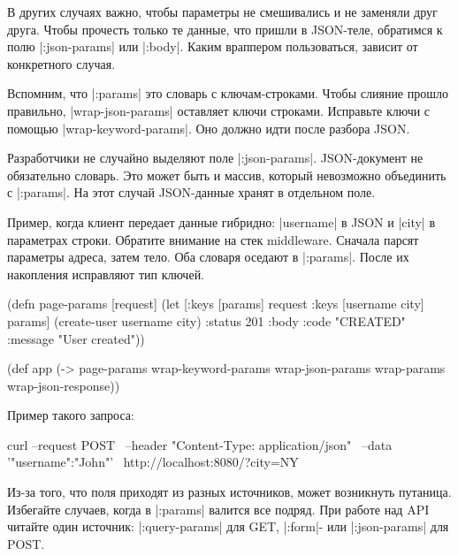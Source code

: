 В других случаях важно, чтобы параметры не смешивались и не заменяли друг
друга. Чтобы прочесть только те данные, что пришли в JSON-теле, обратимся к полю
\spverb|:json-params| или \spverb|:body|. Каким враппером пользоваться, зависит
от конкретного случая.

Вспомним, что \spverb|:params| это словарь с ключам-строками. Чтобы слияние
прошло правильно, \spverb|wrap-json-params| оставляет ключи строками. Исправьте
ключи с помощью \spverb|wrap-keyword-params|. Оно должно идти после разбора
JSON.

Разработчики не случайно выделяют поле \spverb|:json-params|. JSON-документ не
обязательно словарь. Это может быть и массив, который невозможно объединить с
\spverb|:params|. На этот случай JSON-данные хранят в отдельном поле.

Пример, когда клиент передает данные гибридно: \spverb|username| в JSON и
\spverb|city| в параметрах строки. Обратите внимание на стек middleware. Сначала
парсят параметры адреса, затем тело. Оба словаря оседают в
\spverb|:params|. После их накопления исправляют тип ключей.

\begin{english}
  \begin{clojure}
(defn page-params [request]
  (let [{:keys [params]} request
        {:keys [username city]} params]
    (create-user username city)
    {:status 201
     :body {:code "CREATED"
            :message "User created"}}))

(def app (-> page-params
             wrap-keyword-params
             wrap-json-params
             wrap-params
             wrap-json-response))
  \end{clojure}
\end{english}

\noindent
Пример такого запроса:

\begin{english}
  \begin{bash}
curl --request POST \
     --header "Content-Type: application/json" \
     --data '{"username":"John"}' \
     http://localhost:8080/?city=NY
  \end{bash}
\end{english}

Из-за того, что поля приходят из разных источников, может возникнуть
путаница. Избегайте случаев, когда в \spverb|:params| валится все подряд. При
работе над API читайте один источник: \spverb|:query-params| для GET,
\spverb|:form|- или \spverb|:json-params| для POST.

